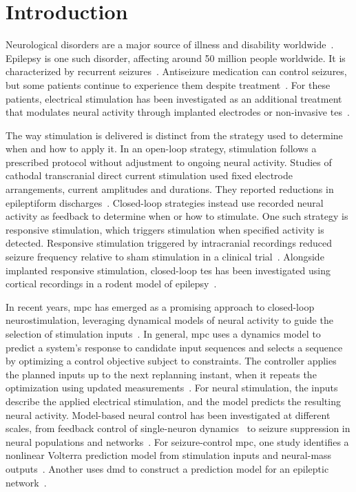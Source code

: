\chapter{Introduction}\label{ch:introduction}

Neurological disorders are a major source of illness and disability worldwide~\cite{WHONeurology2024}.
Epilepsy is one such disorder, affecting around 50 million people worldwide.
It is characterized by recurrent seizures~\cite{WHOEpilepsy2024}.
Antiseizure medication can control seizures, but some patients continue to experience them despite treatment~\cite{Kwan2000,Chen2018}.
For these patients, electrical stimulation has been investigated as an additional treatment that modulates neural activity through implanted electrodes or non-invasive \ac{tes}~\cite{Morrell2011,Fregni2006,Auvichayapat2013}.

The way stimulation is delivered is distinct from the strategy used to determine when and how to apply it.
In an open-loop strategy, stimulation follows a prescribed protocol without adjustment to ongoing neural activity.
Studies of cathodal transcranial direct current stimulation used fixed electrode arrangements, current amplitudes and durations.
They reported reductions in epileptiform discharges~\cite{Fregni2006,Auvichayapat2013}.
Closed-loop strategies instead use recorded neural activity as feedback to determine when or how to stimulate.
One such strategy is responsive stimulation, which triggers stimulation when specified activity is detected.
Responsive stimulation triggered by intracranial recordings reduced seizure frequency relative to sham stimulation in a clinical trial~\cite{Morrell2011}.
Alongside implanted responsive stimulation, closed-loop \ac{tes} has been investigated using cortical recordings in a rodent model of epilepsy~\cite{Berenyi2012}.

In recent years, \ac{mpc} has emerged as a promising approach to closed-loop neurostimulation, leveraging dynamical models of neural activity to guide the selection of stimulation inputs~\cite{Chang2020,Fang2023,Liang2024,Steffen2025}.
In general, \ac{mpc} uses a dynamics model to predict a system's response to candidate input sequences and selects a sequence by optimizing a control objective subject to constraints.
The controller applies the planned inputs up to the next replanning instant, when it repeats the optimization using updated measurements~\cite{Rawlings2017}.
For neural stimulation, the inputs describe the applied electrical stimulation, and the model predicts the resulting neural activity.
Model-based neural control has been investigated at different scales, from feedback control of single-neuron dynamics~\cite{Frohlich2005} to seizure suppression in neural populations and networks~\cite{Chang2020,Liang2024}.
For seizure-control \ac{mpc}, one study identifies a nonlinear Volterra prediction model from stimulation inputs and neural-mass outputs~\cite{Chang2020}.
Another uses \ac{dmd} to construct a prediction model for an epileptic network~\cite{Liang2024}.

